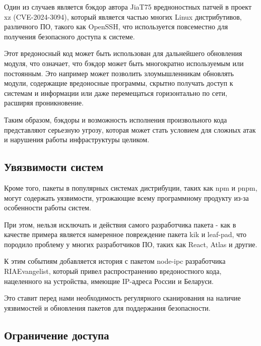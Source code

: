 
Один из случаев является бэкдор автора JiaT75 вредноностных патчей в проект xz (CVE-2024-3094), который является частью многих Linux дистрибутивов, различного ПО, такого как OpenSSH, что используется повсеместно для получения безопасного доступа к системе. \cite{risk:xz_backdoor}

Этот вредоносный код может быть использован для дальнейшего обновления модуля, что означает, что бэкдор может быть многократно используемым или постоянным. Это например может позволить злоумышленникам обновлять модули, содержащие вредоносные программы, скрытно получать доступ к системам и информации или даже перемещаться горизонтально по сети, расширяя проникновение. 

Таким образом, бэкдоры и возможность исполнения произвольного кода представляют серьезную угрозу, которая может стать условием для сложных атак и нарушения работы инфраструктуры целиком.

\subsection{Увязвимости систем}

Кроме того, пакеты в популярных системах дистрибуции, таких как npm и pnpm, могут содержать уязвимости, угрожающие всему программному продукту из-за особенности работы систем. 

При этом, нельзя исключать и действия самого разработчика пакета - как в качестве примера является намеренное повреждение пакета kik и leaf-pad, что породило проблему у многих разработчиков ПО, таких как React, Atlas и другие. \cite{risk:remove-packages}

К этим событиям добавляется история с пакетом node-ipc разработчика RIAEvangelist, который привел распространению вредоностного кода, нацеленного на устройства, имеющие IP-адреса России и Беларуси. \cite{risk:node-npc} \cite{risk:node-npc-2}

Это ставит перед нами необходимость регулярного сканирования на наличие уязвимостей и обновления пакетов для поддержания безопасности.

\subsection{Ограничение доступа}

